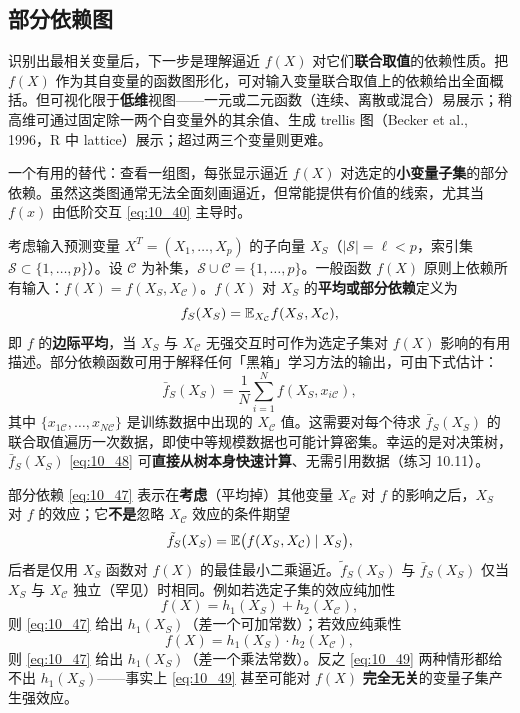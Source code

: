 \subsection{部分依赖图}

识别出最相关变量后，下一步是理解逼近 $f(X)$ 对它们\textbf{联合取值}的依赖性质。把 $f(X)$ 作为其自变量的函数图形化，可对输入变量联合取值上的依赖给出全面概括。但可视化限于\textbf{低维}视图——一元或二元函数（连续、离散或混合）易展示；稍高维可通过固定除一两个自变量外的其余值、生成 trellis 图（Becker et al., 1996，R 中 lattice）展示；超过两三个变量则更难。

一个有用的替代：查看一组图，每张显示逼近 $f(X)$ 对选定的\textbf{小变量子集}的部分依赖。虽然这类图通常无法全面刻画逼近，但常能提供有价值的线索，尤其当 $f(x)$ 由低阶交互 \eqref{eq:10_40} 主导时。

考虑输入预测变量 $X^T = (X_1, \ldots, X_p)$ 的子向量 $X_S$（$|\mathcal{S}| = \ell < p$，索引集 $\mathcal{S} \subset \{1, \ldots, p\}$）。设 $\mathcal{C}$ 为补集，$\mathcal{S} \cup \mathcal{C} = \{1, \ldots, p\}$。一般函数 $f(X)$ 原则上依赖所有输入：$f(X) = f(X_S, X_{\mathcal{C}})$。$f(X)$ 对 $X_S$ 的\textbf{平均或部分依赖}定义为
\begin{equation}\label{eq:10_47}
    f_S(X_S) = \mathbb{E}_{X_{\mathcal{C}}} f(X_S, X_{\mathcal{C}}),
\end{equation}
即 $f$ 的\textbf{边际平均}，当 $X_S$ 与 $X_{\mathcal{C}}$ 无强交互时可作为选定子集对 $f(X)$ 影响的有用描述。部分依赖函数可用于解释任何「黑箱」学习方法的输出，可由下式估计：
\begin{equation}\label{eq:10_48}
    \bar f_S(X_S) = \frac{1}{N}\sum_{i=1}^{N} f(X_S, x_{i\mathcal{C}}),
\end{equation}
其中 $\{x_{1\mathcal{C}}, \ldots, x_{N\mathcal{C}}\}$ 是训练数据中出现的 $X_{\mathcal{C}}$ 值。这需要对每个待求 $\bar f_S(X_S)$ 的联合取值遍历一次数据，即使中等规模数据也可能计算密集。幸运的是对决策树，$\bar f_S(X_S)$ \eqref{eq:10_48} 可\textbf{直接从树本身快速计算}、无需引用数据（练习 10.11）。

\begin{remark}
部分依赖 \eqref{eq:10_47} 表示在\textbf{考虑}（平均掉）其他变量 $X_{\mathcal{C}}$ 对 $f$ 的影响之后，$X_S$ 对 $f$ 的效应；它\textbf{不是}忽略 $X_{\mathcal{C}}$ 效应的条件期望
\begin{equation}\label{eq:10_49}
    \tilde f_S(X_S) = \mathbb{E}\bigl(f(X_S, X_{\mathcal{C}}) \mid X_S\bigr),
\end{equation}
后者是仅用 $X_S$ 函数对 $f(X)$ 的最佳最小二乘逼近。$\tilde f_S(X_S)$ 与 $\bar f_S(X_S)$ 仅当 $X_S$ 与 $X_{\mathcal{C}}$ 独立（罕见）时相同。例如若选定子集的效应纯加性
\begin{equation}\label{eq:10_50}
    f(X) = h_1(X_S) + h_2(X_{\mathcal{C}}),
\end{equation}
则 \eqref{eq:10_47} 给出 $h_1(X_S)$（差一个可加常数）；若效应纯乘性
\begin{equation}\label{eq:10_51}
    f(X) = h_1(X_S)\cdot h_2(X_{\mathcal{C}}),
\end{equation}
则 \eqref{eq:10_47} 给出 $h_1(X_S)$（差一个乘法常数）。反之 \eqref{eq:10_49} 两种情形都给不出 $h_1(X_S)$——事实上 \eqref{eq:10_49} 甚至可能对 $f(X)$ \textbf{完全无关}的变量子集产生强效应。
\end{remark}

